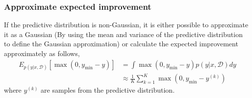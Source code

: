
\subsubsection{Approximate expected improvement}
If the predictive distribution is non-Gaussian, it is either possible to approximate it as a Gaussian
(By using the mean and variance of the predictive distribution to define the Gaussian approximation)
or calculate the expected improvement approximately as follows, 
\begin{align*}
    E_{p(y|x,\mathcal{D})}[\max(0,y_{\min}-y)] &= \int \max(0,y_{\min}-y) p(y|x,\mathcal{D}) dy\\
    &\approx \frac{1}{K} \sum_{k=1}^K  \max(0,y_{\min}-y^{(k)})
\end{align*}
where $y^{(k)}$ are samples from the predictive distribution.





